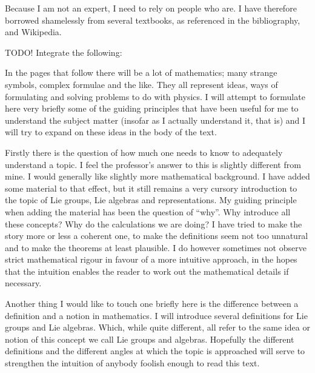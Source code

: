 \documentclass{report}
\begin{document}
Because I am not an expert, I need to rely on people who are. I have therefore borrowed shamelessly from several textbooks, as referenced in the bibliography, and Wikipedia.

TODO! Integrate the following:

In the pages that follow there will be a lot of mathematics; many strange symbols, complex formulae and the like. They all represent ideas, ways of formulating and solving problems to do with physics. I will attempt to formulate here very briefly some of the guiding principles that have been useful for me to understand the subject matter (insofar as I actually understand it, that is) and I will try to expand on these ideas in the body of the text.

Firstly there is the question of how much one needs to know to adequately understand a topic. I feel the professor's answer to this is slightly different from mine. I would generally like slightly more mathematical background. I have added some material to that effect, but it still remains a very cursory introduction to the topic of Lie groups, Lie algebras and representations. My guiding principle when adding the material has been the question of ``why''. Why introduce all these concepts? Why do the calculations we are doing? I have tried to make the story more or less a coherent one, to make the definitions seem not too unnatural and to make the theorems at least plausible. I do however sometimes not observe strict mathematical rigour in favour of a more intuitive approach, in the hopes that the intuition enables the reader to work out the mathematical details if necessary.

Another thing I would like to touch one briefly here is the difference between a definition and a notion in mathematics. I will introduce several definitions for Lie groups and Lie algebras. Which, while quite different, all refer to the same idea or notion of this concept we call Lie groups and algebras. Hopefully the different definitions and the different angles at which the topic is approached will serve to strengthen the intuition of anybody foolish enough to read this text.

\begin{comment}
Finally two general points about why we do what we do in this text. Firstly it is a general goal of mathematics to generalize things and strip away anything that is not strictly necessary. Take for example the notion of a space. We know how to work with normal 3D space. We can measure distances and angles, we can look at neighbourhoods of points etc. Now the mathematician will ask 
- set of point with stuff layered on in order to approximate reality
- mathematical modus operandi (generalisation) -> new physics (cfr. Dirac etc.)
\end{comment}
\end{document}
